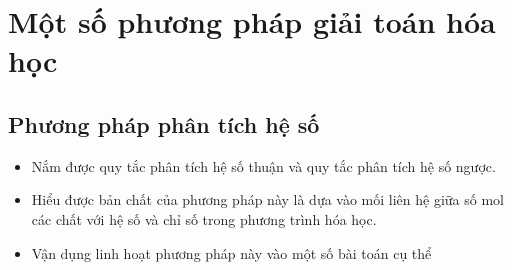 
\chapter{Một số phương pháp giải toán hóa học}
\section{Phương pháp phân tích hệ số}
\begin{MuctieuH}
	\begin{itemize}
		\item Nắm được quy tắc phân tích hệ số thuận và quy tắc phân tích hệ số ngược.
		\item Hiểu được bản chất của phương pháp này là dựa vào mối liên hệ giữa số mol các chất với hệ số và chỉ số trong phương trình hóa học.
		\item Vận dụng linh hoạt phương pháp này vào một số bài toán cụ thể
	\end{itemize}
\end{MuctieuH}
